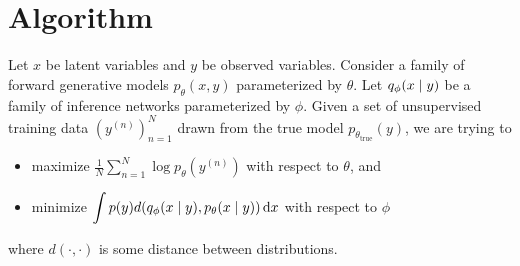 
\section{Algorithm}
\label{sec:algorithm}

Let $x$ be latent variables and $y$ be observed variables.
Consider a family of forward generative models $p_{\theta}(x, y)$ parameterized by $\theta$.
Let $q_{\phi}(x \mid y)$ be a family of inference networks parameterized by $\phi$.
Given a set of unsupervised training data $(y^{(n)})_{n = 1}^N$ drawn from the true model $p_{\theta_{\text{true}}}(y)$, we are trying to
%
\begin{itemize}
\item maximize $\displaystyle\frac{1}{N} \sum_{n = 1}^N \log p_{\theta}(y^{(n)})$ with respect to $\theta$, and
\item minimize $\displaystyle\int p(y) d(q_{\phi}(x \mid y), p_{\theta}(x \mid y)) \,\mathrm dx$ with respect to $\phi$
\end{itemize}
%
where $d(\cdot, \cdot)$ is some distance between distributions.

